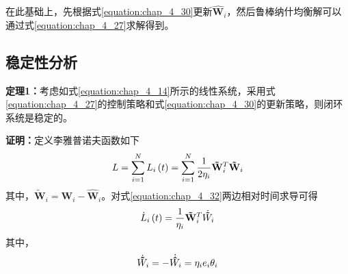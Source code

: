 在此基础上，先根据式\ref{equation:chap_4_30}更新${{\mathbf{\hat W}}_i}$，然后鲁棒纳什均衡解可以通过式\ref{equation:chap_4_27}求解得到。
\subsection{稳定性分析}
\textbf{定理1：}考虑如式\ref{equation:chap_4_14}所示的线性系统，采用式\ref{equation:chap_4_27}的控制策略和式\ref{equation:chap_4_30}的更新策略，则闭环系统是稳定的。

\textbf{证明：}定义李雅普诺夫函数如下
\begin{equation}
  L = \sum\limits_{i = 1}^N {{L_i}\left( t \right)}  = \sum\limits_{i = 1}^N {\frac{1}{{2{\eta _i}}}{{{\bf{\tilde W}}}_i}^T{{{\bf{\tilde W}}}_i}} 
  \label{equation:chap_4_32}
\end{equation}
其中，${{\mathbf{\tilde W}}_i} = {{\mathbf{W}}_i} - {{\mathbf{\hat W}}_i}$。对式\ref{equation:chap_4_32}两边相对时间求导可得
\begin{equation}
  {\dot L_i}\left( t \right) = \frac{1}{{{\eta _i}}}{{\bf{\tilde W}}_i}^T{\dot{\bf{\tilde W}}_i}
  \label{equation:chap_4_33}
\end{equation}
其中，
\begin{equation}
  {\dot{\bf{\tilde W}}_i} =  - {\dot{\bf{\hat W}}_i} = {\eta _i}{e_i}{{\bf{\theta }}_i}
  \label{equation:chap_4_34}
\end{equation}

